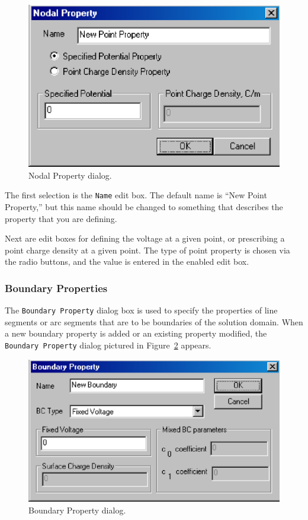 \documentclass[12pt]{report}
\begin{document}
\begin{figure}[htbp]
\centerline{\includegraphics{belaman8.eps}}
\caption{Nodal Property dialog.}
\label{fig8}
\end{figure}




The first selection is the \texttt{Name} edit box. The default name
is ``New Point Property,'' but this name should be changed to
something that describes the property that you are defining.





Next are edit boxes for defining the voltage at a given point, or
prescribing a point charge density at a given point. The type of point
property is chosen via the radio buttons, and the value is entered in the
enabled edit box.

\subsubsection{Boundary Properties}





The \texttt{Boundary Property} dialog box is used to specify the
properties of line segments or arc segments that are to be
boundaries of the solution domain. When a new boundary property is
added or an existing property modified, the \texttt{Boundary
Property} dialog pictured in Figure~\ref{fig9} appears.

\begin{figure}[htbp]
\centerline{\includegraphics{belaman9.eps}}
\caption{Boundary Property dialog.}
\label{fig9}
\end{figure}
\end{document}
